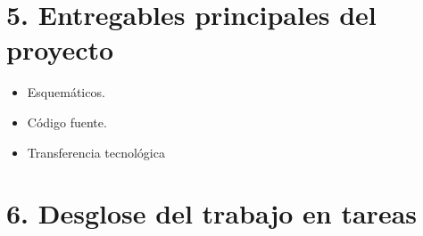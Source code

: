 \documentclass[11pt]{charter}
\begin{document}
\section{5. Entregables principales del proyecto}
\label{sec:entregables}

\begin{itemize}
\item Esquemáticos.
\item Código fuente.
\item Transferencia tecnológica

\end{itemize}



\section{6. Desglose del trabajo en tareas}
\label{sec:wbs}


\end{document}
